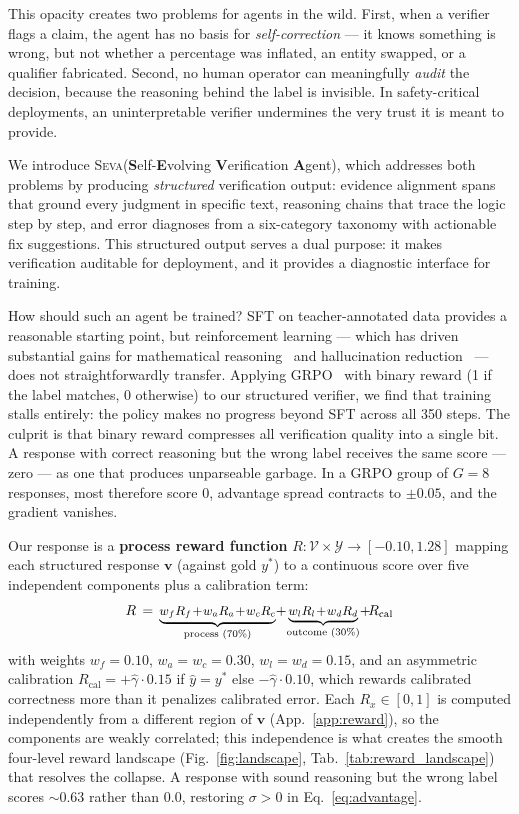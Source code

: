 \documentclass{article}
\newcommand{\seva}{\textsc{Seva}\xspace}
\begin{document}
This opacity creates two problems for agents in the wild.
First, when a verifier flags a claim, the agent has no basis for \emph{self-correction} --- it knows something is wrong, but not whether a percentage was inflated, an entity swapped, or a qualifier fabricated.
Second, no human operator can meaningfully \emph{audit} the decision, because the reasoning behind the label is invisible.
In safety-critical deployments, an uninterpretable verifier undermines the very trust it is meant to provide.

We introduce \seva (\textbf{S}elf-\textbf{E}volving \textbf{V}erification \textbf{A}gent), which addresses both problems by producing \emph{structured} verification output: evidence alignment spans that ground every judgment in specific text, reasoning chains that trace the logic step by step, and error diagnoses from a six-category taxonomy with actionable fix suggestions.
This structured output serves a dual purpose: it makes verification auditable for deployment, and it provides a diagnostic interface for training.

How should such an agent be trained?
SFT on teacher-annotated data provides a reasonable starting point, but reinforcement learning --- which has driven substantial gains for mathematical reasoning~\citep{shao2024deepseekmath,zha2025tango} and hallucination reduction~\citep{li2026march} --- does not straightforwardly transfer.
Applying GRPO~\citep{shao2024deepseekmath} with binary reward (1 if the label matches, 0 otherwise) to our structured verifier, we find that training stalls entirely: the policy makes no progress beyond SFT across all 350 steps.
The culprit is that binary reward compresses all verification quality into a single bit.
A response with correct reasoning but the wrong label receives the same score --- zero --- as one that produces unparseable garbage.
In a GRPO group of $G{=}8$ responses, most therefore score 0, advantage spread contracts to $\pm 0.05$, and the gradient vanishes.

Our response is a \textbf{process reward function} $R: \mathcal{V} \times \mathcal{Y} \to [-0.10, 1.28]$ mapping each structured response $\mathbf{v}$ (against gold $y^*$) to a continuous score over five independent components plus a calibration term:
\begin{equation}
\small
R \,=\, \underbrace{w_f R_f \!+\! w_a R_a \!+\! w_c R_c}_{\text{process }(70\%)} \!+\! \underbrace{w_l R_l \!+\! w_d R_d}_{\text{outcome }(30\%)} \!+\! R_{\text{cal}}
\label{eq:reward}
\end{equation}
with weights $w_f{=}0.10$, $w_a{=}w_c{=}0.30$, $w_l{=}w_d{=}0.15$, and an asymmetric calibration $R_{\text{cal}} = +\hat{\gamma}{\cdot}0.15$ if $\hat{y}{=}y^*$ else $-\hat{\gamma}{\cdot}0.10$, which rewards calibrated correctness more than it penalizes calibrated error.
Each $R_x \in [0, 1]$ is computed independently from a different region of $\mathbf{v}$ (App.~\ref{app:reward}), so the components are weakly correlated; this independence is what creates the smooth four-level reward landscape (Fig.~\ref{fig:landscape}, Tab.~\ref{tab:reward_landscape}) that resolves the collapse.
A response with sound reasoning but the wrong label scores $\sim 0.63$ rather than $0.0$, restoring $\sigma > 0$ in Eq.~\ref{eq:advantage}.
\end{document}
